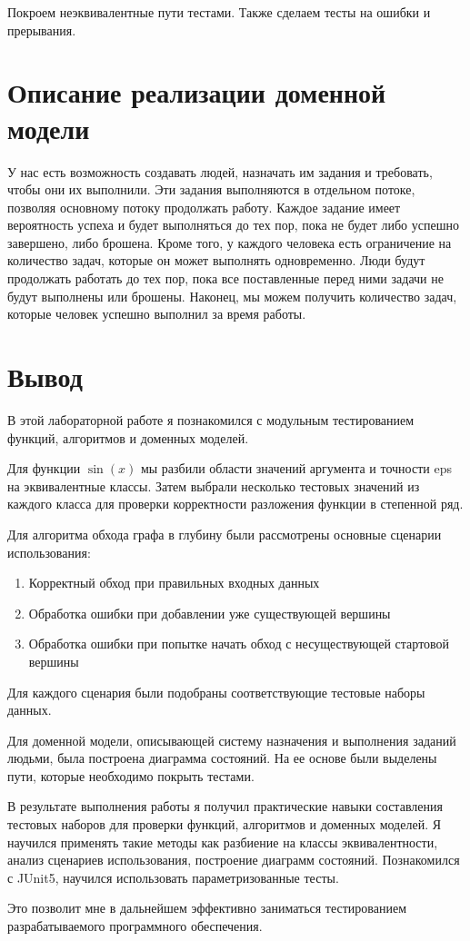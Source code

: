 \documentclass[12pt,onecolumn]{article}
\begin{document}
Покроем неэквивалентные пути тестами. Также сделаем тесты на ошибки и прерывания. 
\section*{Описание реализации доменной модели}
У нас есть возможность создавать людей, назначать им задания и требовать, чтобы они их выполнили.
Эти задания выполняются в отдельном потоке, позволяя основному потоку продолжать работу. 
Каждое задание имеет вероятность успеха и будет выполняться до тех пор, пока не будет либо успешно завершено, либо брошена.
Кроме того, у каждого человека есть ограничение на количество задач, которые он может выполнять одновременно.
Люди будут продолжать работать до тех пор, пока все поставленные перед ними задачи не будут выполнены или брошены.  
Наконец, мы можем получить количество задач, которые человек успешно выполнил за время работы.

\section{Вывод}
В этой лабораторной работе я познакомился с модульным тестированием функций, алгоритмов и доменных моделей.

Для функции $\sin(x)$ мы разбили области значений аргумента и точности eps на эквивалентные классы. Затем выбрали несколько тестовых значений из каждого класса для проверки корректности разложения функции в степенной ряд.

Для алгоритма обхода графа в глубину были рассмотрены основные сценарии использования:
\begin{enumerate}
    \item Корректный обход при правильных входных данных
    \item Обработка ошибки при добавлении уже существующей вершины
    \item Обработка ошибки при попытке начать обход с несуществующей стартовой вершины 
\end{enumerate}
Для каждого сценария были подобраны соответствующие тестовые наборы данных.

Для доменной модели, описывающей систему назначения и выполнения заданий людьми, была построена диаграмма состояний. На ее основе были выделены пути, которые необходимо покрыть тестами.

В результате выполнения работы я получил практические навыки составления тестовых наборов для проверки функций, алгоритмов и доменных моделей. Я научился применять такие методы как разбиение на классы эквивалентности, анализ сценариев использования, построение диаграмм состояний.
Познакомился с JUnit5, научился использовать параметризованные тесты.

Это позволит мне в дальнейшем эффективно заниматься тестированием разрабатываемого программного обеспечения.
\end{document}
